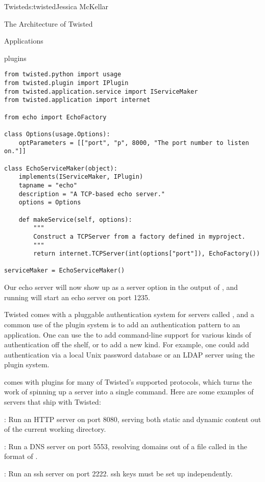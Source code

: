 \begin{aosachapter}{Twisted}{s:twisted}{Jessica McKellar}
\begin{aosasect1}{The Architecture of Twisted}
\begin{aosasect2}{Applications}
\begin{aosasect3}{plugins}
\begin{verbatim}
from twisted.python import usage
from twisted.plugin import IPlugin
from twisted.application.service import IServiceMaker
from twisted.application import internet

from echo import EchoFactory

class Options(usage.Options):
    optParameters = [["port", "p", 8000, "The port number to listen on."]]

class EchoServiceMaker(object):
    implements(IServiceMaker, IPlugin)
    tapname = "echo"
    description = "A TCP-based echo server."
    options = Options

    def makeService(self, options):
        """
        Construct a TCPServer from a factory defined in myproject.
        """
        return internet.TCPServer(int(options["port"]), EchoFactory())

serviceMaker = EchoServiceMaker()
\end{verbatim}

Our echo server will now show up as a server option in the output of
, and running 
will start an echo server on port 1235.

Twisted comes with a pluggable authentication system for servers called
, and a common use of the plugin system is to add an
authentication pattern to an application. One can use the 
 to add command-line support for various kinds of
authentication off the shelf, or to add a new kind. For example, one could add
authentication via a local Unix password database or an LDAP server using the
plugin system.

 comes with plugins for many of Twisted's supported protocols,
which turns the work of spinning up a server into a single command. Here are
some examples of  servers that ship with Twisted:

\begin{aosaitemize}

\item {}:  Run an HTTP server on
  port 8080, serving both static and dynamic content out of the
  current working directory.

\item {}: Run a DNS server
  on port 5553, resolving domains out of a file called  in the
  format of .

\item {}: Run an ssh server on port
  2222. ssh keys must be set up independently.


\end{aosaitemize}
\end{aosasect3}
\end{aosasect2}
\end{aosasect1}
\end{aosachapter}
